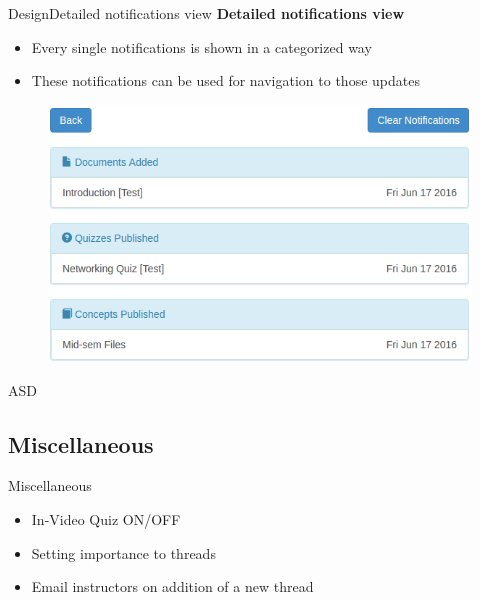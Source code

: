 \documentclass[xcolor=table]{beamer}
\begin{document}
\begin{frame}{Design}{Detailed notifications view}
\textbf{Detailed notifications view}
	\begin{itemize}
		\item Every single notifications is shown in a categorized way
		\item These notifications can be used for navigation to those updates
	\end{itemize}
	\begin{figure}
	\centering
	\includegraphics[width=0.6\linewidth]{./media/detailed_view}
	\label{fig:detailed_view}
	\end{figure}
\end{frame}

\begin{frame}{ASD}
\end{frame}

\subsection{Miscellaneous}

\begin{frame}{Miscellaneous}
	\begin{itemize}
		\item In-Video Quiz ON/OFF
		\item Setting importance to threads
		\item Email instructors on addition of a new thread
	\end{itemize}
\end{frame}

%
%
\end{document}
